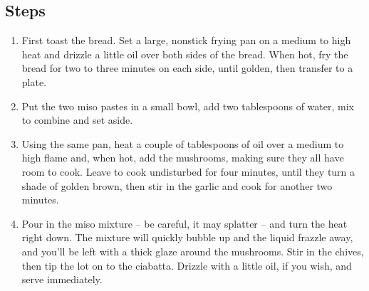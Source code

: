 \documentclass{book}
\begin{document}
\subsection*{Steps}
\begin{enumerate}
\item First toast the bread. Set a large, nonstick frying pan on a medium to high heat and drizzle a little oil over both sides of the bread. When hot, fry the bread for two to three minutes on each side, until golden, then transfer to a plate.
\item Put the two miso pastes in a small bowl, add two tablespoons of water, mix to combine and set aside.
\item Using the same pan, heat a couple of tablespoons of oil over a medium to high flame and, when hot, add the mushrooms, making sure they all have room to cook. Leave to cook undisturbed for four minutes, until they turn a shade of golden brown, then stir in the garlic and cook for another two minutes.
\item Pour in the miso mixture – be careful, it may splatter – and turn the heat right down. The mixture will quickly bubble up and the liquid frazzle away, and you’ll be left with a thick glaze around the mushrooms. Stir in the chives, then tip the lot on to the ciabatta. Drizzle with a little oil, if you wish, and serve immediately.
\end{enumerate}
\newpage
\end{document}

